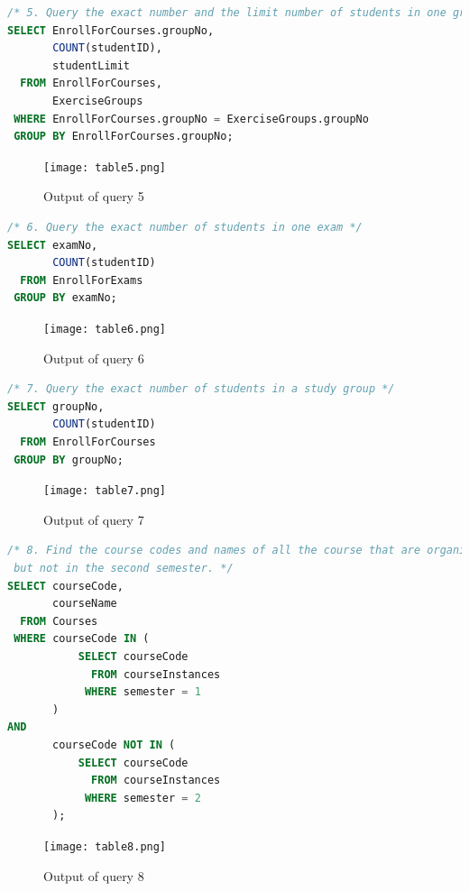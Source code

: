 \documentclass{article}
\begin{document}
\begin{lstlisting}[language=SQL]
/* 5. Query the exact number and the limit number of students in one group */
SELECT EnrollForCourses.groupNo,
       COUNT(studentID),
       studentLimit
  FROM EnrollForCourses,
       ExerciseGroups
 WHERE EnrollForCourses.groupNo = ExerciseGroups.groupNo
 GROUP BY EnrollForCourses.groupNo;
\end{lstlisting}

\begin{figure}[!h]
	\centering
	\texttt{[image: table5.png]}
	\caption{Output of query 5}
	\label{fig:5}
\end{figure}

\begin{lstlisting}[language=SQL]
/* 6. Query the exact number of students in one exam */
SELECT examNo,
       COUNT(studentID) 
  FROM EnrollForExams
 GROUP BY examNo;
\end{lstlisting}

\begin{figure}[!h]
	\centering
	\texttt{[image: table6.png]}
	\caption{Output of query 6}
	\label{fig:6}
\end{figure}

\begin{lstlisting}[language=SQL]
/* 7. Query the exact number of students in a study group */
SELECT groupNo,
       COUNT(studentID) 
  FROM EnrollForCourses
 GROUP BY groupNo;
\end{lstlisting}

\begin{figure}[!h]
	\centering
	\texttt{[image: table7.png]}
	\caption{Output of query 7}
	\label{fig:7}
\end{figure}

\begin{lstlisting}[language=SQL]
/* 8. Find the course codes and names of all the course that are organized during the second semester,
 but not in the second semester. */
SELECT courseCode,
       courseName
  FROM Courses
 WHERE courseCode IN (
           SELECT courseCode
             FROM courseInstances
            WHERE semester = 1
       )
AND 
       courseCode NOT IN (
           SELECT courseCode
             FROM courseInstances
            WHERE semester = 2
       );
\end{lstlisting}

\begin{figure}[!h]
	\centering
	\texttt{[image: table8.png]}
	\caption{Output of query 8}
	\label{fig:8}
\end{figure}
\end{document}
